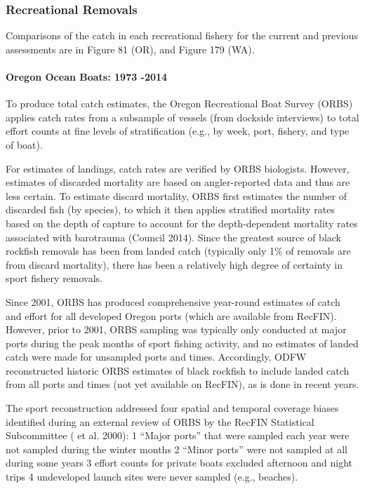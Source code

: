 \documentclass[11pt,
  english,
  letterpaper,
]{article}
\begin{document}
\hypertarget{recreational-removals}{%
\subsubsection{Recreational Removals}\label{recreational-removals}}

Comparisons of the catch in each recreational fishery for the current and previous assessments are in Figure 81 (OR), and Figure 179 (WA).

\hypertarget{oregon-ocean-boats-1973--2014}{%
\paragraph{Oregon Ocean Boats: 1973 -2014}\label{oregon-ocean-boats-1973--2014}}

To produce total catch estimates, the Oregon Recreational Boat Survey (ORBS) applies catch rates from a subsample of vessels (from dockside interviews) to total effort counts at fine levels of stratification (e.g., by week, port, fishery, and type of boat).

For estimates of landings, catch rates are verified by ORBS biologists. However, estimates of discarded mortality are based on angler-reported data and thus are less certain. To estimate discard mortality, ORBS first estimates the number of discarded fish (by species), to which it then applies stratified mortality rates based on the depth of capture to account for the depth-dependent mortality rates associated with barotrauma (Council 2014). Since the greatest source of black rockfish removals has been from landed catch (typically only 1\% of removals are from discard mortality), there has been a relatively high degree of certainty in sport fishery removals.

Since 2001, ORBS has produced comprehensive year-round estimates of catch and effort for all developed Oregon ports (which are available from RecFIN). However, prior to 2001, ORBS sampling was typically only conducted at major ports during the peak months of sport fishing activity, and no estimates of landed catch were made for unsampled ports and times. Accordingly, ODFW reconstructed historic ORBS estimates of black rockfish to include landed catch from all ports and times (not yet available on RecFIN), as is done in recent years.

The sport reconstruction addressed four spatial and temporal coverage biases identified during an external review of ORBS by the RecFIN Statistical Subcommittee ( et al. 2000): 1 ``Major ports'' that were sampled each year were not sampled during the winter months 2 ``Minor ports'' were not sampled at all during some years 3 effort counts for private boats excluded afternoon and night trips 4 undeveloped launch sites were never sampled (e.g., beaches).
\end{document}
